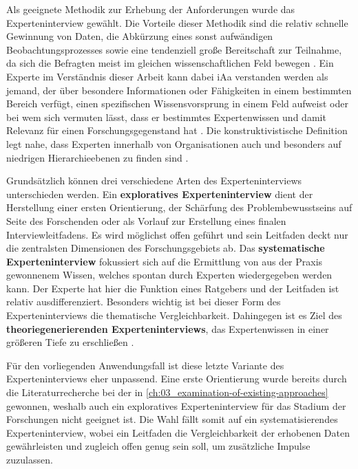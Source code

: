 Als geeignete Methodik zur Erhebung der Anforderungen wurde das Experteninterview gewählt. Die Vorteile dieser Methodik sind die relativ schnelle Gewinnung von Daten, die Abkürzung eines sonst aufwändigen Beobachtungsprozesses sowie eine tendenziell große Bereitschaft zur Teilnahme, da sich die Befragten meist im gleichen wissenschaftlichen Feld bewegen \cite{401:Das-Experteninterview}. Ein Experte im Verständnis dieser Arbeit kann dabei \acrshort{iAa} \citeauthor{401:Das-Experteninterview} verstanden werden als jemand, der über besondere Informationen oder Fähigkeiten in einem bestimmten Bereich verfügt, einen spezifischen Wissensvorsprung in einem Feld aufweist oder bei wem sich vermuten lässt, dass er bestimmtes Expertenwissen und damit Relevanz für einen Forschungsgegenstand hat \cite{401:Das-Experteninterview}. Die konstruktivistische Definition legt nahe, dass Experten innerhalb von Organisationen auch und besonders auf niedrigen Hierarchieebenen zu finden sind \cite{401:Das-Experteninterview}.

Grundsätzlich können drei verschiedene Arten des Experteninterviews unterschieden werden. Ein \textbf{exploratives Experteninterview} dient der Herstellung einer ersten Orientierung, der Schärfung des Problembewusstseins auf Seite des Forschenden oder als Vorlauf zur Erstellung eines finalen Interviewleitfadens. Es wird möglichst offen geführt und sein Leitfaden deckt nur die zentralsten Dimensionen des Forschungsgebiets ab. Das \textbf{systematische Experteninterview} fokussiert sich auf die Ermittlung von aus der Praxis gewonnenem Wissen, welches spontan durch Experten wiedergegeben werden kann. Der Experte hat hier die Funktion eines Ratgebers und der Leitfaden ist relativ ausdifferenziert. Besonders wichtig ist bei dieser Form des Experteninterviews die thematische Vergleichbarkeit. Dahingegen ist es Ziel des \textbf{theoriegenerierenden Experteninterviews}, das Expertenwissen in einer größeren Tiefe zu erschließen \cite{401:Das-Experteninterview}.

Für den vorliegenden Anwendungsfall ist diese letzte Variante des Experteninterviews eher unpassend. Eine erste Orientierung wurde bereits durch die Literaturrecherche bei der  in \autoref{ch:03_examination-of-existing-approaches} gewonnen, weshalb auch ein exploratives Experteninterview für das Stadium der Forschungen nicht geeignet ist. Die Wahl fällt somit auf ein systematisierendes Experteninterview, wobei ein Leitfaden die Vergleichbarkeit der erhobenen Daten gewährleisten und zugleich offen genug sein soll, um zusätzliche Impulse zuzulassen.

